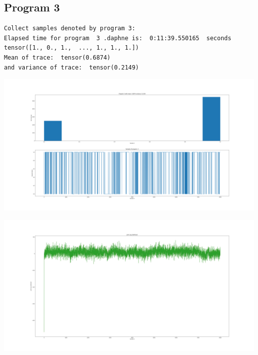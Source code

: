 \documentclass[]{article}
\begin{document}
\subsection{Program 3}
\begin{verbatim}
Collect samples denoted by program 3:
Elapsed time for program  3 .daphne is:  0:11:39.550165  seconds
tensor([1., 0., 1.,  ..., 1., 1., 1.])
Mean of trace:  tensor(0.6874)  
and variance of trace:  tensor(0.2149)
\end{verbatim}
\begin{center}
	\includegraphics[width=\linewidth]{Figures/p3_MHGibbs.png}
\end{center}
\begin{center}
	\includegraphics[width=\linewidth]{Figures/p3_MHGibbsjll.png}
\end{center}
\end{document}
